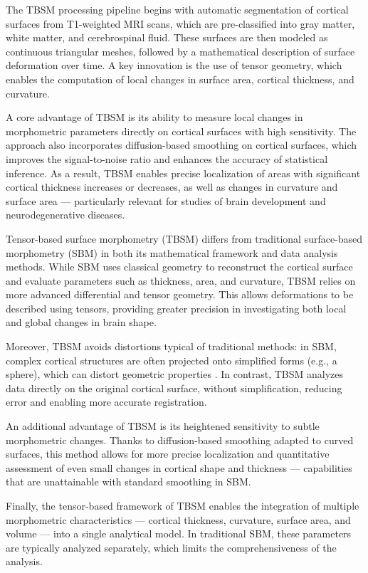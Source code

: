 \documentclass[default]{subfiles}
\begin{document}
The TBSM processing pipeline begins with automatic segmentation of cortical surfaces from T1-weighted MRI scans, which
are pre-classified into gray matter, white matter, and cerebrospinal fluid. These surfaces are then modeled as
continuous triangular meshes, followed by a mathematical description of surface deformation over time. A key
innovation is the use of tensor geometry, which enables the computation of local changes in surface area, cortical
thickness, and curvature.

A core advantage of TBSM is its ability to measure local changes in morphometric parameters directly on cortical
surfaces with high sensitivity. The approach also incorporates diffusion-based smoothing on cortical surfaces, which
improves the signal-to-noise ratio and enhances the accuracy of statistical inference. As a result, TBSM enables
precise localization of areas with significant cortical thickness increases or decreases, as well as changes in
curvature and surface area — particularly relevant for studies of brain development and neurodegenerative diseases.

Tensor-based surface morphometry (TBSM) differs from traditional surface-based morphometry (SBM) in both its
mathematical framework and data analysis methods. While SBM uses classical geometry to reconstruct the cortical
surface and evaluate parameters such as thickness, area, and curvature, TBSM relies on more advanced differential
and tensor geometry. This allows deformations to be described using tensors, providing greater precision in
investigating both local and global changes in brain shape.

Moreover, TBSM avoids distortions typical of traditional methods: in SBM, complex cortical structures are often
projected onto simplified forms (e.g., a sphere), which can distort geometric properties \cite{chung_2002}. In
contrast, TBSM analyzes data directly on the original cortical surface, without simplification, reducing error and
enabling more accurate registration.

An additional advantage of TBSM is its heightened sensitivity to subtle morphometric changes. Thanks to diffusion-based
smoothing adapted to curved surfaces, this method allows for more precise localization and quantitative assessment of
even small changes in cortical shape and thickness — capabilities that are unattainable with standard smoothing in SBM.

Finally, the tensor-based framework of TBSM enables the integration of multiple morphometric characteristics — cortical
thickness, curvature, surface area, and volume — into a single analytical model. In traditional SBM, these parameters
are typically analyzed separately, which limits the comprehensiveness of the analysis.
\end{document}
